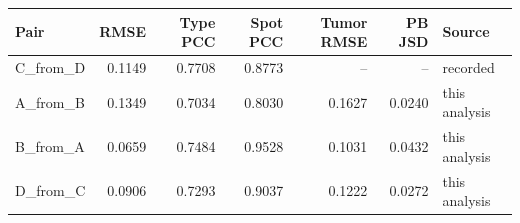 \begin{tabular}{lrrrrrl}
\toprule
Pair & RMSE & Type PCC & Spot PCC & Tumor RMSE & PB JSD & Source \\
\midrule
C\_from\_D & 0.1149 & 0.7708 & 0.8773 & -- & -- & recorded \\
A\_from\_B & 0.1349 & 0.7034 & 0.8030 & 0.1627 & 0.0240 & this analysis \\
B\_from\_A & 0.0659 & 0.7484 & 0.9528 & 0.1031 & 0.0432 & this analysis \\
D\_from\_C & 0.0906 & 0.7293 & 0.9037 & 0.1222 & 0.0272 & this analysis \\
\bottomrule
\end{tabular}

